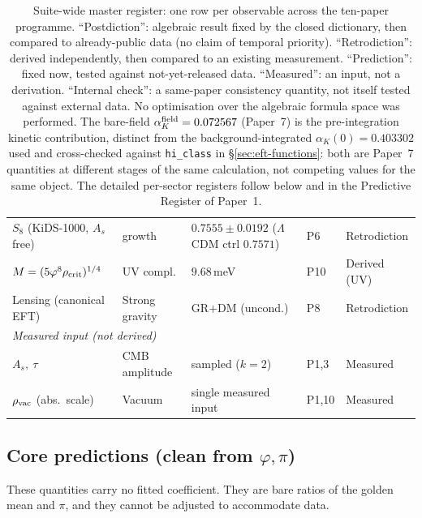 \documentclass[aps,prd,preprint,amsmath,amssymb,nofootinbib,longbibliography]{revtex4-2}
\begin{document}
\begin{table}[h]
{\begin{tabular}{@{}lllll@{}}
$S_8$ (KiDS-1000, $A_s$ free) & growth  & $0.7555\pm0.0192$ ($\Lambda$CDM ctrl $0.7571$) & P6 & Retrodiction \\
$M=(5\varphi^8\rho_{\rm crit})^{1/4}$ & UV compl.  & $9.68\,$meV                    & P10    & Derived (UV) \\
Lensing (canonical EFT)       & Strong gravity    & GR$+$DM (uncond.)              & P8     & Retrodiction \\
\midrule
\multicolumn{5}{l}{\textit{Measured input (not derived)}} \\
$A_s,\ \tau$                  & CMB amplitude     & sampled ($k=2$)                & P1,3   & Measured \\
$\rho_{\rm vac}$ (abs.\ scale) & Vacuum            & single measured input          & P1,10  & Measured \\
\bottomrule
\end{tabular}%
}
\caption{Suite-wide master register: one row per observable across the ten-paper
programme. ``Postdiction'': algebraic result fixed by the closed dictionary, then
compared to already-public data (no claim of temporal priority). ``Retrodiction'':
derived independently, then compared to an existing measurement. ``Prediction'':
fixed now, tested against not-yet-released data. ``Measured'': an input, not a
derivation. ``Internal check'': a same-paper consistency quantity, not itself
tested against external data. No optimisation over the algebraic formula space
was performed. The bare-field $\alpha_K^{\rm field}=0.072567$ (Paper~7) is the
pre-integration kinetic contribution, distinct from the background-integrated
$\alpha_K(0)=0.403302$ used and cross-checked against \texttt{hi\_class} in
\S\ref{sec:eft-functions}: both are Paper~7 quantities at different stages of
the same calculation, not competing values for the same object. The detailed
per-sector registers follow below and in the Predictive Register of Paper~1.}
\label{tab:master}
\end{table}

\subsection{Core predictions (clean from $\varphi,\pi$)}

These quantities carry no fitted coefficient. They are bare ratios of the
golden mean and $\pi$, and they cannot be adjusted to accommodate data.
\end{document}
